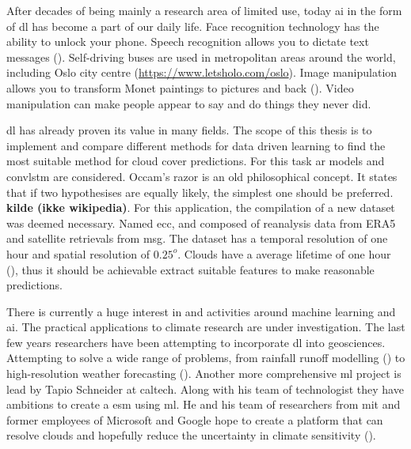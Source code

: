 
After decades of being mainly a research area of limited use, today \acrfull{ai} in the form of \acrfull{dl} has become a part of our daily life. Face recognition technology has the ability to unlock your phone. Speech recognition allows you to dictate text messages (\cite{Sak2014LongRecognition}). Self-driving buses are used in metropolitan areas around the world, including Oslo city centre (\href{https://www.letsholo.com/oslo}{https://www.letsholo.com/oslo}). Image manipulation allows you to transform Monet paintings to pictures and back (\cite{zhu2017_cycleGAN_monet_zebra}). Video manipulation can make people appear to say and do things they never did. 

\acrshort{dl} has already proven its value in many fields. The scope of this thesis is to implement and compare different methods for data driven learning to find the most suitable method for cloud cover predictions. For this task \acrfull{ar} models and \acrfull{convlstm} are considered. 
Occam's razor is an old philosophical concept. It states that if two hypothesises are equally likely, the simplest one should be preferred. \textbf{kilde (ikke wikipedia)}. For this application, the compilation of a new dataset was deemed necessary. Named \acrfull{ecc}, and composed of reanalysis data from ERA5 and satellite retrievals from \acrfull{msg}. The dataset has a temporal resolution of one hour and spatial resolution of $0.25^o$. Clouds have a average lifetime of one hour (\cite{lohmann2016}), thus it should be achievable extract suitable features to make reasonable predictions. 

There is currently a huge interest in and activities around machine learning and \acrshort{ai}. The practical applications to climate research are under investigation. The last few years researchers have been attempting to incorporate \acrshort{dl} into geosciences. Attempting to solve a wide range of problems, from rainfall runoff modelling (\cite{hess-23-5089-2019}) to  high-resolution weather forecasting (\cite{Rodrigues2018DeepDownscale:Forecast}). Another more comprehensive \acrshort{ml} project is lead by Tapio Schneider at \acrfull{caltech}. Along with his team of technologist they have ambitions to create a \acrshort{esm} using \acrshort{ml}. He and his team of researchers from \acrfull{mit} and former employees of Microsoft and Google hope to create a platform that can resolve clouds and hopefully reduce the uncertainty in climate sensitivity (\cite{Voosen2018ScienceIntelligence}).

